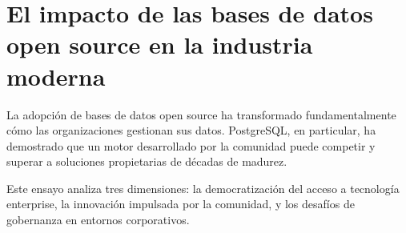 \section*{El impacto de las bases de datos open source en la industria moderna}

La adopción de bases de datos open source ha transformado fundamentalmente cómo las organizaciones gestionan sus datos. PostgreSQL, en particular, ha demostrado que un motor desarrollado por la comunidad puede competir y superar a soluciones propietarias de décadas de madurez.

Este ensayo analiza tres dimensiones: la democratización del acceso a tecnología enterprise, la innovación impulsada por la comunidad, y los desafíos de gobernanza en entornos corporativos.
